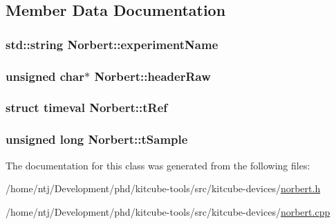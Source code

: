 \subsection{Member Data Documentation}
\hypertarget{classNorbert_a7970cd046899ac6ae80af302650ac0de}{
\subsubsection[{experiment\-Name}]{\setlength{\rightskip}{0pt plus 5cm}std\-::string Norbert\-::experiment\-Name\hspace{0.3cm}{\ttfamily [private]}}}\label{classNorbert_a7970cd046899ac6ae80af302650ac0de}
\hypertarget{classNorbert_a6f35c603a911f44e8d436bfa3ee3d166}{
\subsubsection[{header\-Raw}]{\setlength{\rightskip}{0pt plus 5cm}unsigned char$\ast$ Norbert\-::header\-Raw\hspace{0.3cm}{\ttfamily [private]}}}\label{classNorbert_a6f35c603a911f44e8d436bfa3ee3d166}
\hypertarget{classNorbert_ac6365eaac8871d1af382adf9700b3e82}{
\subsubsection[{t\-Ref}]{\setlength{\rightskip}{0pt plus 5cm}struct timeval Norbert\-::t\-Ref\hspace{0.3cm}{\ttfamily [private]}}}\label{classNorbert_ac6365eaac8871d1af382adf9700b3e82}
\hypertarget{classNorbert_ad046d88d69a2c5e0eb93e7f1b26bc5fd}{
\subsubsection[{t\-Sample}]{\setlength{\rightskip}{0pt plus 5cm}unsigned long Norbert\-::t\-Sample\hspace{0.3cm}{\ttfamily [private]}}}\label{classNorbert_ad046d88d69a2c5e0eb93e7f1b26bc5fd}


The documentation for this class was generated from the following files\-:\begin{DoxyCompactItemize}
\item 
/home/ntj/\-Development/phd/kitcube-\/tools/src/kitcube-\/devices/\hyperlink{norbert_8h}{norbert.\-h}\item 
/home/ntj/\-Development/phd/kitcube-\/tools/src/kitcube-\/devices/\hyperlink{norbert_8cpp}{norbert.\-cpp}\end{DoxyCompactItemize}
